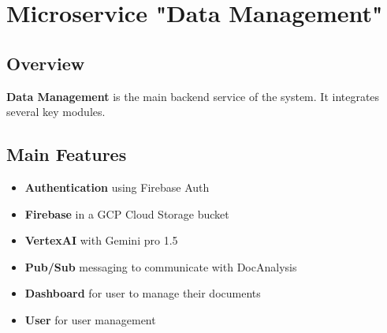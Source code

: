 \chapter{Microservice "Data Management"}

\section{Overview}
\textbf{Data Management} is the main backend service of the system. It integrates several key modules.

\section{Main Features}
\begin{itemize}
    \item \textbf{Authentication} using Firebase Auth
    \item \textbf{Firebase} in a GCP Cloud Storage bucket
    \item \textbf{VertexAI} with Gemini pro 1.5
    \item \textbf{Pub/Sub} messaging to communicate with DocAnalysis
    \item \textbf{Dashboard} for user to manage their documents
    \item \textbf{User} for user management
\end{itemize}










